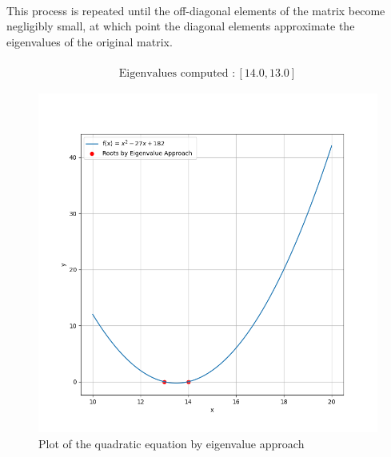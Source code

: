 \documentclass[journal]{IEEEtran}
\begin{document}
{\begin{align}
\end{align}
This process is repeated until the off-diagonal elements of the matrix become negligibly small, at which point the diagonal elements approximate the eigenvalues of the original matrix.\\ \\
 \begin{align}
	\text{Eigenvalues computed :}\, [14.0, 13.0]
\end{align}
\begin{figure}[h]
    \centering
    \includegraphics[width=\columnwidth]{plots/plot2.png}
    \caption{Plot of the quadratic equation by eigenvalue approach}
    \label{fig:Plot1}
    \end{figure}
}
\end{document}
